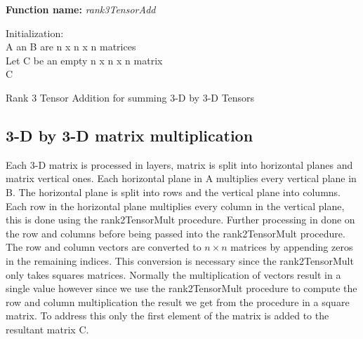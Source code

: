 \documentclass[10pt,journal]{article}
\begin{document}
\bigbreak
\begin{algorithm}[H]
\SetAlgoLined
\textbf{Function name:} \emph{rank3TensorAdd}

Initialization\::\\ 
 A an B are n x n x n matrices\\
 Let C be an empty n x n x n matrix\\

\Return C

\caption{Rank 3 Tensor Addition for summing 3-D by 3-D Tensors}
\end{algorithm}

\subsection{3-D by 3-D matrix multiplication}
Each 3-D matrix is processed in layers, matrix is split into horizontal planes and matrix vertical ones. Each horizontal plane in A multiplies every vertical plane in B. The horizontal plane is split into rows and the vertical plane into columns. Each row in the horizontal plane multiplies every column in the vertical plane, this is done using the rank2TensorMult procedure. Further processing in done on the row and columns before being passed into the rank2TensorMult procedure. The row and column vectors are converted to $n \times n$ matrices by appending zeros in the remaining indices. This conversion is necessary since the rank2TensorMult only takes squares matrices. Normally the multiplication of vectors result in a single value however since we use the rank2TensorMult procedure to compute the row and column multiplication the result we get from the procedure in a square matrix. To address this only the first element of the matrix is added to the resultant matrix C.
\end{document}
